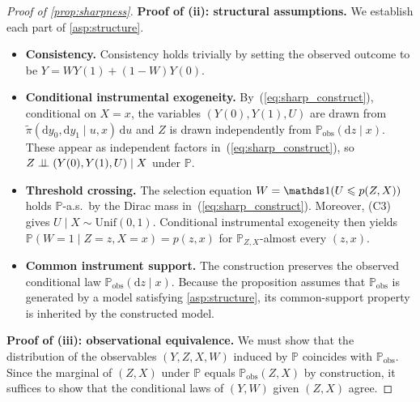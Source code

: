 \begin{proof}[Proof of \cref{prop:sharpness}]
    \medskip
    \noindent\textbf{Proof of (ii): structural assumptions.}
    We establish each part of \cref{asp:structure}.
    \begin{itemize}
        \item \textbf{Consistency.} Consistency holds trivially by setting the observed outcome to be $Y = W Y(1) + (1-W) Y(0)$.
        \item \textbf{Conditional instrumental exogeneity.} By~(\ref{eq:sharp_construct}), conditional on $X = x$, the variables $(Y(0), Y(1), U)$ are drawn from $\tilde{\pi}(\mathrm{d}y_0, \mathrm{d}y_1 \mid u, x) \, \mathrm{d}u$ and $Z$ is drawn independently from $\mathbb{P}_{\text{obs}}(\mathrm{d}z \mid x)$. These appear as independent factors in~(\ref{eq:sharp_construct}), so $Z \perp\!\!\!\perp (Y(0), Y(1), U) \mid X$ under $\mathbb{P}$.
        \item \textbf{Threshold crossing.} The selection equation $W = \indicator(U \leqslant p(Z,X))$ holds $\mathbb{P}$-a.s.\ by the Dirac mass in~(\ref{eq:sharp_construct}). Moreover, (C3) gives $U \mid X \sim \mathrm{Unif}(0,1)$. Conditional instrumental exogeneity then yields $\mathbb P(W=1\mid Z=z,X=x)=p(z,x)$ for $\mathbb P_{Z,X}$-almost every $(z,x)$.
        \item \textbf{Common instrument support.} The construction preserves the observed conditional law $\mathbb P_{\mathrm{obs}}(\mathrm dz\mid x)$. Because the proposition assumes that $\mathbb P_{\mathrm{obs}}$ is generated by a model satisfying \cref{asp:structure}, its common-support property is inherited by the constructed model.
    \end{itemize}

    \medskip
    \noindent\textbf{Proof of (iii): observational equivalence.}
    We must show that the distribution of the observables $(Y, Z, X, W)$ induced by $\mathbb{P}$ coincides with $\mathbb{P}_{\text{obs}}$. Since the marginal of $(Z, X)$ under $\mathbb{P}$ equals $\mathbb{P}_{\text{obs}}(Z, X)$ by construction, it suffices to show that the conditional laws of $(Y, W)$ given $(Z, X)$ agree.


\end{proof}
